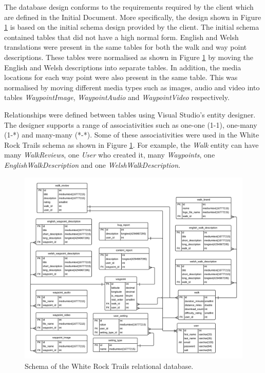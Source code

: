 \documentclass[11pt,a4paper]{article}
\begin{document}
The database design conforms to the requirements required by the client which are defined in the Initial Document. 
More specifically, the design shown in Figure \ref{fig:DatabaseSchema} is based on the initial schema design provided by the client. 
The initial schema contained tables that did not have a high normal form. 
English and Welsh translations were present in the same tables for both the walk and way point descriptions. 
These tables were normalised as shown in Figure \ref{fig:DatabaseSchema} by moving the English and Welsh descriptions into separate tables.
In addition, the media locations for each way point were also present in the same table.
This was normalised by moving different media types such as images, audio and video into tables \emph{WaypointImage}, \emph{WaypointAudio} and \emph{WaypointVideo} respectively.

Relationships were defined between tables using Visual Studio's entity designer. 
The designer supports a range of associativities such as one-one (1-1), one-many (1-*) and many-many (*-*). 
Some of these associativities were used in the White Rock Trails schema as shown in Figure \ref{fig:DatabaseSchema}.
For example, the \emph{Walk} entity can have many \emph{WalkReviews}, one \emph{User} who created it, many \emph{Waypoints}, one \emph{EnglishWalkDescription} and one \emph{WelshWalkDescription}.

\begin{figure}[H]
\centering
\includegraphics[angle=90, width=1\textwidth]{./img/DatabaseSchema}
\caption{Schema of the White Rock Trails relational database.}
\label{fig:DatabaseSchema}
\end{figure}
\end{document}
